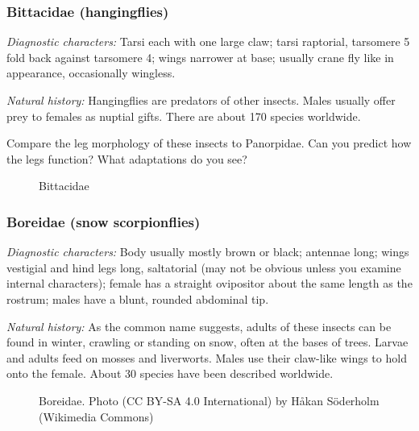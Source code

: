 \subsubsection{Bittacidae (hangingflies)}
\noindent{}\textit{Diagnostic characters:} Tarsi each with one large claw; tarsi raptorial, tarsomere 5 fold back against tarsomere 4; wings narrower at base; usually crane fly like in appearance, occasionally wingless.\vspace{3mm}

\noindent{}\textit{Natural history:} Hangingflies are predators of other insects. Males usually offer prey to females as nuptial gifts. There are about 170 species worldwide.\vspace{3mm}

\begin{theo}
{}Compare the leg morphology of these insects to Panorpidae. Can you predict how the legs function? What adaptations do you see?
\end{theo}

\begin{figure}[ht!]
  \centering
  \caption{Bittacidae \citep[Modified from][Fig. 1]{Du_Hua_2017}}
  \label{fig:bittacid}
\end{figure}

\subsubsection{Boreidae (snow scorpionflies)}
\noindent{}\textit{Diagnostic characters:} Body usually mostly brown or black; antennae long; wings vestigial and hind legs long, saltatorial (may not be obvious unless you examine internal characters); female has a straight ovipositor about the same length as the rostrum; males have a blunt, rounded abdominal tip.\vspace{3mm}

\noindent{}\textit{Natural history:} As the common name suggests, adults of these insects can be found in winter, crawling or standing on snow, often at the bases of trees. Larvae and adults feed on mosses and liverworts. Males use their claw-like wings to hold onto the female. About 30 species have been described worldwide.

\begin{figure}[ht!]
  \centering
  \caption{Boreidae. Photo (CC BY-SA 4.0 International) by H\aa{}kan S\"oderholm (Wikimedia Commons)}
  \label{fig:boreid}
\end{figure}

